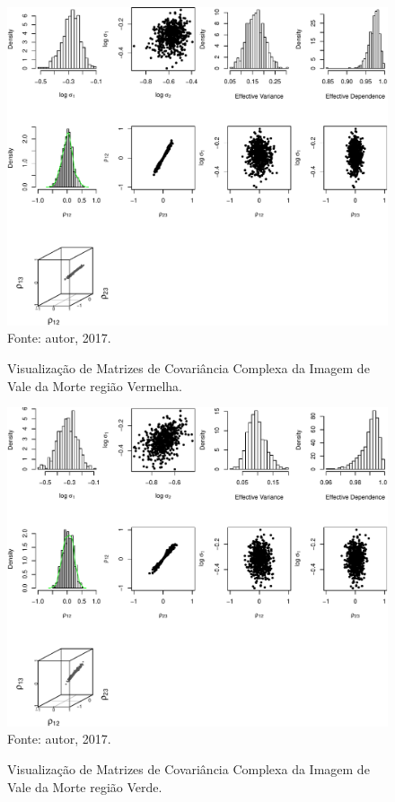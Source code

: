 \documentclass[a4paper,12pt]{article}
\begin{document}
\newpage

\begin{figure}[ht]
\centering
\caption{Visualização de Matrizes de Covariância Complexa da Imagem de Vale da Morte região Vermelha.}
\includegraphics[width=\linewidth]{../../Figuras/Amostras-Death/Death-Vermelha-500.pdf}\\
Fonte: autor, 2017.
\label{visDeath3}
\end{figure}

\newpage

\begin{figure}[ht]
\centering
\caption{Visualização de Matrizes de Covariância Complexa da Imagem de Vale da Morte região Verde.}
\includegraphics[width=\linewidth]{../../Figuras/Amostras-Death/Death-Verde-500.pdf}\\
Fonte: autor, 2017.
\label{visDeath4}
\end{figure}
\end{document}
